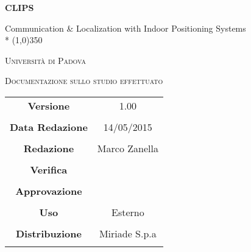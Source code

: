 \documentclass[a4paper,12pt]{article}
\author{Marco Zanella}
\date{14/05/2016}
\begin{document}
\begin{titlepage}
	\centering
	{\huge\bfseries CLIPS\par}
	Communication \& Localization with Indoor Positioning Systems \\*
	\line(1,0){350} \\
	{\scshape\LARGE Università di Padova \par}
	\vspace{1cm}
	{\scshape\Large Documentazione sullo studio effettuato \par}
	\logo
	\newpage
	\begin{tabular}{c|c}
		{\hfill \textbf{Versione}} 			& 1.00				\\ \\
		{\hfill\textbf{Data Redazione}} 	& 14/05/2015  		\\ \\
		{\hfill\textbf{Redazione}} 			& Marco Zanella 	\\ \\
		{\hfill\textbf{Verifica}} 			&  					\\ \\
		{\hfill\textbf{Approvazione}} 		&  					\\ \\
		{\hfill\textbf{Uso}} 				& Esterno 			\\ \\
		{\hfill\textbf{Distribuzione}} 		& Miriade S.p.a		\\ \\
	\end{tabular}
\end{titlepage}
	
	\newpage

	\tableofcontents
	
	\label{LastFrontPage}
	

	\newpage
	
	\pagestyle{mymain}
		
		\newpage
		
		\newpage
		
		\newpage
		
		\newpage
		
		\newpage
		
		\newpage
		
		\newpage

		
	\label{LastPage}
\end{document}
